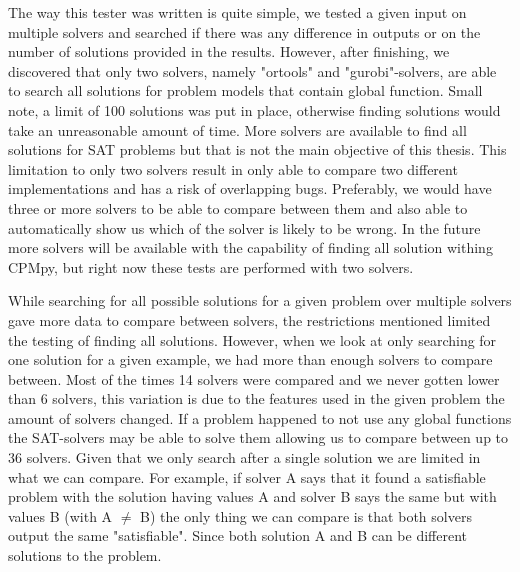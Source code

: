 The way this tester was written is quite simple, we tested a given input on multiple solvers and searched if there was any difference in outputs or on the number of solutions provided in the results.
However, after finishing, we discovered that only two solvers, namely "ortools" and "gurobi"-solvers, are able to search all solutions for problem models that contain global function. Small note, a limit of 100 solutions was put in place, otherwise finding solutions would take an unreasonable amount of time. More solvers are available to find all solutions for SAT problems but that is not the main objective of this thesis. This limitation to only two solvers result in only able to compare two different implementations and has a risk of overlapping bugs. Preferably, we would have three or more solvers to be able to compare between them and also able to automatically show us which of the solver is likely to be wrong. In the future more solvers will be available with the capability of finding all solution withing CPMpy, but right now these tests are performed with two solvers. 

While searching for all possible solutions for a given problem over multiple solvers gave more data to compare between solvers, the restrictions mentioned limited the testing of finding all solutions. However, when we look at only searching for one solution for a given example, we had more than enough solvers to compare between. Most of the times 14 solvers were compared and we never gotten lower than 6 solvers, this variation is due to the features used in the given problem the amount of solvers changed. If a problem happened to not use any global functions the SAT-solvers may be able to solve them allowing us to compare between up to 36 solvers. Given that we only search after a single solution we are limited in what we can compare. For example, if solver A says that it found a satisfiable problem with the solution having values A and solver B says the same but with values B (with A $\neq$ B) the only thing we can compare is that both solvers output the same "satisfiable". Since both solution A and B can be different solutions to the problem.


